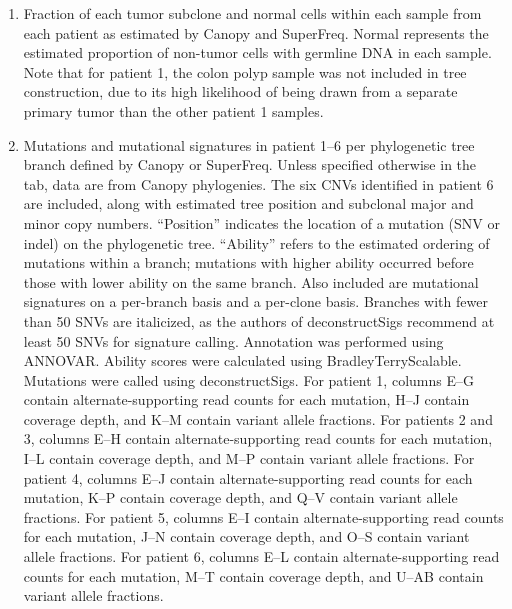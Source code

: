 \begin{enumerate}
    \item Fraction of each tumor subclone and normal cells within each sample from each patient as estimated by Canopy and SuperFreq. Normal represents the estimated proportion of non-tumor cells with germline DNA in each sample. Note that for patient 1, the colon polyp sample was not included in tree construction, due to its high likelihood of being drawn from a separate primary tumor than the other patient 1 samples.
    \item Mutations and mutational signatures in patient 1--6 per phylogenetic tree branch defined by Canopy or SuperFreq. Unless specified otherwise in the tab, data are from Canopy phylogenies. The six CNVs identified in patient 6 are included, along with estimated tree position and subclonal major and minor copy numbers. ``Position'' indicates the location of a mutation (SNV or indel) on the phylogenetic tree. ``Ability'' refers to the estimated ordering of mutations within a branch; mutations with higher ability occurred before those with lower ability on the same branch. Also included are mutational signatures on a per-branch basis and a per-clone basis. Branches with fewer than 50 SNVs are italicized, as the authors of deconstructSigs recommend at least 50 SNVs for signature calling. Annotation was performed using ANNOVAR\@. Ability scores were calculated using BradleyTerryScalable. Mutations were called using deconstructSigs. For patient 1, columns E--G contain alternate-supporting read counts for each mutation, H--J contain coverage depth, and K--M contain variant allele fractions. For patients 2 and 3, columns E--H contain alternate-supporting read counts for each mutation, I--L contain coverage depth, and M--P contain variant allele fractions. For patient 4, columns E--J contain alternate-supporting read counts for each mutation, K--P contain coverage depth, and Q--V contain variant allele fractions. For patient 5, columns E--I contain alternate-supporting read counts for each mutation, J--N contain coverage depth, and O--S contain variant allele fractions. For patient 6, columns E--L contain alternate-supporting read counts for each mutation, M--T contain coverage depth, and U--AB contain variant allele fractions.
	

\end{enumerate}
